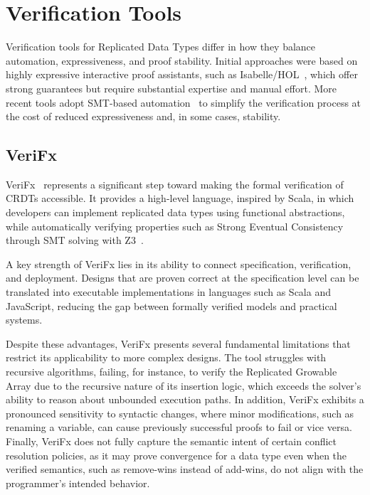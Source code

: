 \section{Verification Tools}
\label{sec:tools}

Verification tools for Replicated Data Types differ in how they balance automation, expressiveness, and proof stability. Initial approaches were based on highly expressive interactive proof assistants, such as Isabelle/HOL~\cite{isabelle}, which offer strong guarantees but require substantial expertise and manual effort. More recent tools adopt SMT-based automation~\cite{porre2023masses} to simplify the verification process at the cost of reduced expressiveness and, in some cases, stability.

\subsection{VeriFx}
\label{sub:verifx}

VeriFx~\cite{porre2023masses} represents a significant step toward making the formal verification of CRDTs accessible. It provides a high-level language, inspired by Scala, in which developers can implement replicated data types using functional abstractions, while automatically verifying properties such as Strong Eventual Consistency through SMT solving with Z3~\cite{z3}.

A key strength of VeriFx lies in its ability to connect specification, verification, and deployment. Designs that are proven correct at the specification level can be translated into executable implementations in languages such as Scala and JavaScript, reducing the gap between formally verified models and practical systems.

Despite these advantages, VeriFx presents several fundamental limitations that restrict its applicability to more complex designs. The tool struggles with recursive algorithms, failing, for instance, to verify the Replicated Growable Array due to the recursive nature of its insertion logic, which exceeds the solver’s ability to reason about unbounded execution paths. In addition, VeriFx exhibits a pronounced sensitivity to syntactic changes, where minor modifications, such as renaming a variable, can cause previously successful proofs to fail or vice versa. Finally, VeriFx does not fully capture the semantic intent of certain conflict resolution policies, as it may prove convergence for a data type even when the verified semantics, such as remove-wins instead of add-wins, do not align with the programmer’s intended behavior.

